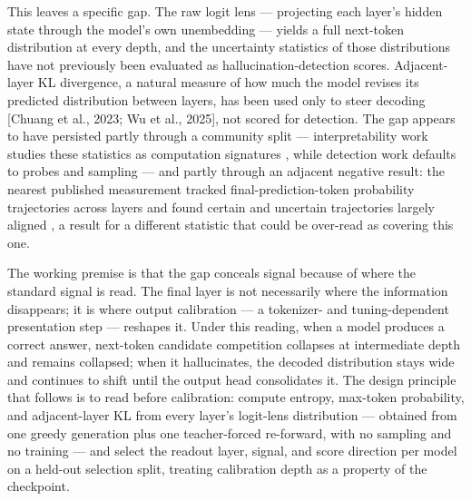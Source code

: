 This leaves a specific gap. The raw logit lens --- projecting each layer's hidden state through the model's own unembedding --- yields a full next-token distribution at every depth, and the uncertainty statistics of those distributions have not previously been evaluated as hallucination-detection scores. Adjacent-layer KL divergence, a natural measure of how much the model revises its predicted distribution between layers, has been used only to steer decoding [Chuang et al., 2023; Wu et al., 2025], not scored for detection. The gap appears to have persisted partly through a community split --- interpretability work studies these statistics as computation signatures \citep{Ali2025}, while detection work defaults to probes and sampling --- and partly through an adjacent negative result: the nearest published measurement tracked final-prediction-token probability trajectories across layers and found certain and uncertain trajectories largely aligned \citep{Kim2025}, a result for a different statistic that could be over-read as covering this one.

The working premise is that the gap conceals signal because of where the standard signal is read. The final layer is not necessarily where the information disappears; it is where output calibration --- a tokenizer- and tuning-dependent presentation step --- reshapes it. Under this reading, when a model produces a correct answer, next-token candidate competition collapses at intermediate depth and remains collapsed; when it hallucinates, the decoded distribution stays wide and continues to shift until the output head consolidates it. The design principle that follows is to read before calibration: compute entropy, max-token probability, and adjacent-layer KL from every layer's logit-lens distribution --- obtained from one greedy generation plus one teacher-forced re-forward, with no sampling and no training --- and select the readout layer, signal, and score direction per model on a held-out selection split, treating calibration depth as a property of the checkpoint.

